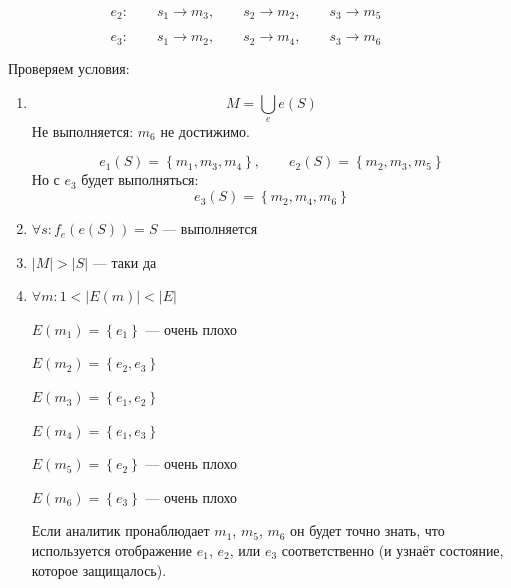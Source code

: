 \begin{equation*}
{e}_{2}:\qquad
{s}_{1}\rightarrow {m}_{3},\qquad
{s}_{2}\rightarrow {m}_{2},\qquad
{s}_{3}\rightarrow {m}_{5} \qquad
\end{equation*}

\begin{equation*}
{e}_{3}:\qquad
{s}_{1}\rightarrow {m}_{2},\qquad
{s}_{2}\rightarrow {m}_{4},\qquad
{s}_{3}\rightarrow {m}_{6} \qquad
\end{equation*}

Проверяем условия:
\begin{enumerate}
  \item
    \begin{equation*}
      M=\bigcup\limits_{e}e\left(S\right)
    \end{equation*}
    Не выполняется: ${m}_{6}$ не достижимо.

    \begin{equation*}
      {e}_{1}\left(S\right)=\left\{{m}_{1},{m}_{3},{m}_{4}\right\},\qquad
      {e}_{2}\left(S\right)=\left\{{m}_{2},{m}_{3},{m}_{5}\right\}
    \end{equation*}
    Но с ${e}_{3}$ будет выполняться: 
    \begin{equation*}
      {e}_{3}\left(S\right)=\left\{{m}_{2},{m}_{4},{m}_{6}\right\}
    \end{equation*}

  \item
    ${\forall}s:{f}_{e}\left(e\left(S\right)\right)=S$ --- выполняется

  \item
    $\left| M \right| > \left| S \right|$ --- таки да

  \item
    ${\forall}m:1<\left|E\left(m\right)\right|<\left|E\right|$

    $E\left({m}_{1}\right)=\left\{{e}_{1}\right\}$ --- очень плохо

    $E\left({m}_{2}\right)=\left\{{e}_{2},{e}_{3}\right\}$

    $E\left({m}_{3}\right)=\left\{{e}_{1},{e}_{2}\right\}$

    $E\left({m}_{4}\right)=\left\{{e}_{1},{e}_{3}\right\}$

    $E\left({m}_{5}\right)=\left\{{e}_{2}\right\}$ --- очень плохо

    $E\left({m}_{6}\right)=\left\{{e}_{3}\right\}$ --- очень плохо

    Если аналитик пронаблюдает  ${m}_{1}$, ${m}_{5}$, ${m}_{6}$ он будет точно
    знать, что используется отображение  ${e}_{1}$,  ${e}_{2}$, или 
    ${e}_{3}$ соответственно (и узнаёт состояние, которое защищалось). 


\end{enumerate}
